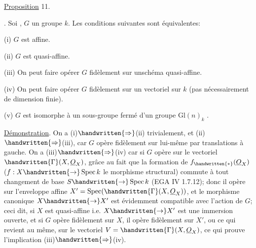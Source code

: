 \uline{Proposition} 11.. Soi , $G$ un groupe  $k$. Les conditions suivantes sont équivalentes:

(i) $G$ est affine.

(ii) $G$ est quasi-affine.

(iii) On peut faire opérer $G$ fidèlement sur unschéma quasi-affine.

(iv) On peut faire opérer $G$ fidèlement sur un vectoriel sur $k$ (pas nécessairement de dimension finie).

(v)  $G$ est isomorphe à un sous-groupe fermé d'un groupe $\mathrm{Gl}(n)_k$ .

\uline{Démonstration}. On a (i)$\handwritten{\Rightarrow}$(ii) trivialement, et (ii)$\handwritten{\Rightarrow}$(iii), car $G$ opère fidèlement sur lui-même par translations à gauche. On a (iii)$\handwritten{\Rightarrow}$(iv) car si $G$ opère  sur le vectoriel $\handwritten{\Gamma}(X,\underline{O}_X)$, grâce au fait que la formation de $f_{\handwritten{*}}(\underline{O}_X)$ ($f:X\handwritten{\to}\operatorname{Spec}k$ le morphisme structural) commute à tout changement de base $S\handwritten{\to}\operatorname{Spec}k$ (EGA IV 1.7.12); donc il opère sur l'enveloppe affine $X'=\operatorname{Spec}(\handwritten{\Gamma}(X,\underline{O}_X))$, et le morphisme canonique $X\handwritten{\to}X'$ est évidemment compatible avec l'action de $G$; ceci dit, si $X$ est quasi-affine i.e. $X\handwritten{\to}X'$ est une immersion ouverte, et si $G$ opère fidèlement sur $X$, il opère fidèlement sur $X'$, ou ce qui revient au même, sur le vectoriel $V=\handwritten{\Gamma}(X,\underline{O}_X)$, ce qui prouve l'implication (iii)$\handwritten{\Rightarrow}$(iv).

